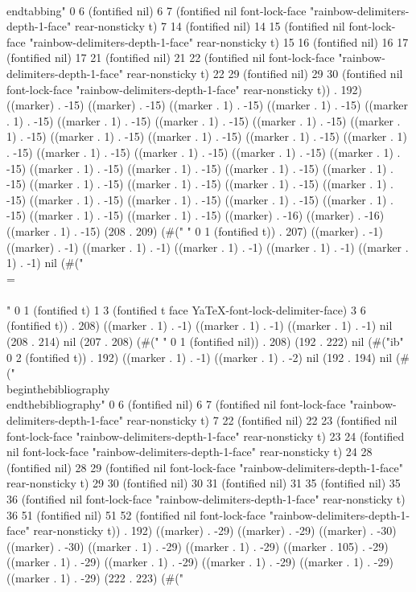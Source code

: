 { \\end{tabbing}" 0 6 (fontified nil) 6 7 (fontified nil font-lock-face "rainbow-delimiters-depth-1-face" rear-nonsticky t) 7 14 (fontified nil) 14 15 (fontified nil font-lock-face "rainbow-delimiters-depth-1-face" rear-nonsticky t) 15 16 (fontified nil) 16 17 (fontified nil) 17 21 (fontified nil) 21 22 (fontified nil font-lock-face "rainbow-delimiters-depth-1-face" rear-nonsticky t) 22 29 (fontified nil) 29 30 (fontified nil font-lock-face "rainbow-delimiters-depth-1-face" rear-nonsticky t)) . 192) ((marker) . -15) ((marker) . -15) ((marker . 1) . -15) ((marker . 1) . -15) ((marker . 1) . -15) ((marker . 1) . -15) ((marker . 1) . -15) ((marker . 1) . -15) ((marker . 1) . -15) ((marker . 1) . -15) ((marker . 1) . -15) ((marker . 1) . -15) ((marker . 1) . -15) ((marker . 1) . -15) ((marker . 1) . -15) ((marker . 1) . -15) ((marker . 1) . -15) ((marker . 1) . -15) ((marker . 1) . -15) ((marker . 1) . -15) ((marker . 1) . -15) ((marker . 1) . -15) ((marker . 1) . -15) ((marker . 1) . -15) ((marker . 1) . -15) ((marker . 1) . -15) ((marker . 1) . -15) ((marker . 1) . -15) ((marker . 1) . -15) ((marker . 1) . -15) ((marker . 1) . -15) ((marker) . -16) ((marker) . -16) ((marker . 1) . -15) (208 . 209) (#("
" 0 1 (fontified t)) . 207) ((marker) . -1) ((marker) . -1) ((marker . 1) . -1) ((marker . 1) . -1) ((marker . 1) . -1) ((marker . 1) . -1) nil (#(" \\= \\\\" 0 1 (fontified t) 1 3 (fontified t face YaTeX-font-lock-delimiter-face) 3 6 (fontified t)) . 208) ((marker . 1) . -1) ((marker . 1) . -1) ((marker . 1) . -1) nil (208 . 214) nil (207 . 208) (#(" " 0 1 (fontified nil)) . 208) (192 . 222) nil (#("ib" 0 2 (fontified t)) . 192) ((marker . 1) . -1) ((marker . 1) . -2) nil (192 . 194) nil (#("\\begin{thebibliography}{test}
 \\end{thebibliography}" 0 6 (fontified nil) 6 7 (fontified nil font-lock-face "rainbow-delimiters-depth-1-face" rear-nonsticky t) 7 22 (fontified nil) 22 23 (fontified nil font-lock-face "rainbow-delimiters-depth-1-face" rear-nonsticky t) 23 24 (fontified nil font-lock-face "rainbow-delimiters-depth-1-face" rear-nonsticky t) 24 28 (fontified nil) 28 29 (fontified nil font-lock-face "rainbow-delimiters-depth-1-face" rear-nonsticky t) 29 30 (fontified nil) 30 31 (fontified nil) 31 35 (fontified nil) 35 36 (fontified nil font-lock-face "rainbow-delimiters-depth-1-face" rear-nonsticky t) 36 51 (fontified nil) 51 52 (fontified nil font-lock-face "rainbow-delimiters-depth-1-face" rear-nonsticky t)) . 192) ((marker) . -29) ((marker) . -29) ((marker) . -30) ((marker) . -30) ((marker . 1) . -29) ((marker . 1) . -29) ((marker . 105) . -29) ((marker . 1) . -29) ((marker . 1) . -29) ((marker . 1) . -29) ((marker . 1) . -29) ((marker . 1) . -29) (222 . 223) (#("
}
